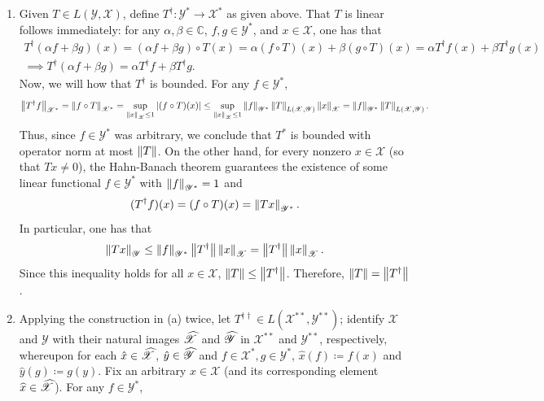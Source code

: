 \documentclass{article}
\begin{document}
	\begin{enumerate}[itemsep =-2pt,label = (\alph{*})]
		\item Given $T \in L(\mathscr{Y}, \mathscr{X})$, define $T^{\dagger}: \mathscr{Y}^{\ast} \to \mathscr{X}^{\ast}$ as given above. That $T$ is linear follows immediately: for any $\alpha, \beta \in \mathbb{C}$, $f, g \in \mathscr{Y}^{\ast}$, and $x \in \mathscr{X}$, one has that 
		\begin{multline*}
			T^{\dagger}(\alpha f + \beta g)(x) = (\alpha f + \beta g) \circ T(x) = \alpha (f \circ T)(x) + \beta (g \circ T)(x) = \alpha T^{\dagger}f(x) + \beta T^{\dagger}g(x) \\ \implies T^{\dagger}(\alpha f + \beta g) = \alpha T^{\dagger}f + \beta T^{\dagger}g. 
		\end{multline*}
		Now, we will how that $T^{\dagger}$ is bounded. For any $f \in \mathscr{Y}^{\ast}$, 
		\begin{equation*}
			\left\Vert T^{\dagger}f \right\Vert_{\mathscr{X}^{\ast}} = \left\Vert f \circ T \right\Vert_{\mathscr{X}^{\ast}} = \sup_{\left\Vert x \right\Vert_{\mathscr{X}}\leq 1}|(f \circ T)(x)| \leq \sup_{\left\Vert x \right\Vert_{\mathscr{X}} \leq 1}\left\Vert f \right\Vert_{\mathscr{Y}^{\ast}}\left\Vert T \right\Vert_{L(\mathscr{X}, \mathscr{Y})}\left\Vert x \right\Vert_{\mathscr{X}} = \left\Vert f \right\Vert_{\mathscr{Y}^{\ast}}\left\Vert T \right\Vert_{L(\mathscr{X}, \mathscr{Y})}. 
		\end{equation*}
		Thus, since $f \in \mathscr{Y}^{\ast}$ was arbitrary, we conclude that $T^{\ast}$ is bounded with operator norm at most $\left\Vert T \right\Vert$. On the other hand, for every nonzero $x \in \mathscr{X}$ (so that $Tx \neq 0$), the Hahn-Banach theorem guarantees the existence of some linear functional $f \in\mathscr{Y}^{\ast}$ with $\left\Vert f \right\Vert_{\mathscr{Y}^{\ast}} = 1$ and
		\begin{equation*}
			(T^{\dagger}f)(x) = (f \circ T)(x) = \left\Vert Tx \right\Vert_{\mathscr{Y}^{\ast}}. 
		\end{equation*}
		In particular, one has that
		\begin{equation*}
			\left\Vert Tx \right\Vert_{\mathscr{Y}} \leq \left\Vert f \right\Vert_{\mathscr{Y}^{\ast}}\left\Vert T^{\dagger} \right\Vert\left\Vert x \right\Vert_{\mathscr{X}} = \left\Vert T^{\dagger} \right\Vert\left\Vert x \right\Vert_{\mathscr{X}}. 
		\end{equation*}
		Since this inequality holds for all $x \in \mathscr{X}$, $\left\Vert T \right\Vert \leq \left\Vert T^{\dagger} \right\Vert$. Therefore, $\left\Vert T \right\Vert = \left\Vert T^{\dagger} \right\Vert$. 
		\item Applying the construction in (a) twice, let $T^{\dagger\dagger} \in L(\mathscr{X}^{\ast\ast}, \mathscr{Y}^{\ast\ast})$; identify $\mathscr{X}$ and $\mathscr{Y}$ with their natural images $\widehat{\mathscr{X}}$ and $\widehat{\mathscr{Y}}$ in $\mathscr{X}^{\ast\ast}$ and $\mathscr{Y}^{\ast\ast}$, respectively, whereupon for each $\hat{x} \in \widehat{\mathscr{X}}$, $\hat{y} \in \widehat{\mathscr{Y}}$ and $f \in \mathscr{X}^{\ast}, g \in \mathscr{Y}^{\ast}$, $\hat{x}(f) \coloneqq f(x)$ and $\hat{y}(g) \coloneqq g(y)$. Fix an arbitrary $x \in \mathscr{X}$ (and its corresponding element $\widehat{x} \in \widehat{\mathscr{X}}$). For any $f \in \mathscr{Y}^{\ast}$, 

\end{enumerate}
\end{document}
